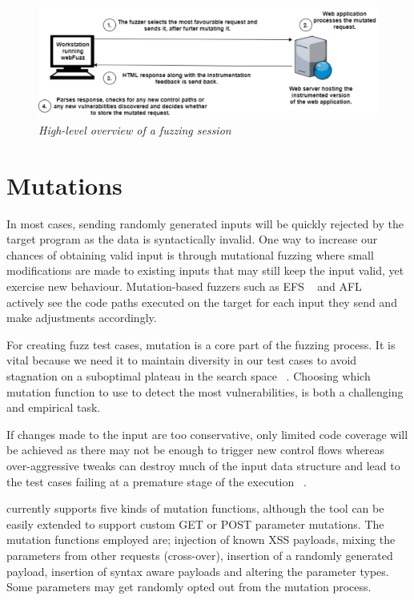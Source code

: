 \begin{figure}[ht]
 \centering
 \captionsetup{justification=centering}
 \includegraphics[width=\linewidth]{figures/architecture.pdf}
 \caption[High-level overview of a \pname{} fuzzing session]{\textit{High-level overview of a \pname{} fuzzing session}}
 \label{fig:architecture}
\end{figure}

\section{Mutations}
In most cases, sending randomly generated inputs will be quickly rejected by the target program as the data is syntactically invalid. One way to increase our chances of obtaining valid input is through mutational fuzzing where small modifications are made to existing inputs that may still keep the input valid, yet exercise new behaviour. Mutation-based fuzzers such as EFS ~\cite{efs2007} and AFL ~\cite{zalewski2015american} actively see the code paths executed on the target for each input they send and make adjustments accordingly. 

For creating fuzz test cases, mutation is a core part of the fuzzing process. It is vital because we need it to maintain diversity in our test cases to avoid stagnation on a suboptimal plateau in the search space ~\cite{seal2016Genetic}. Choosing which mutation function to use to detect the most vulnerabilities, is both a challenging and empirical task. 

If changes made to the input are too conservative, only limited code coverage will be achieved as there may not be enough to trigger new control flows whereas over-aggressive tweaks can destroy much of the input data structure and lead to the test cases failing at a premature stage of the execution ~\cite{zalewski2014Mutations}.

\pname{} currently supports five kinds of mutation functions, although the tool can be easily
extended to support custom GET or POST parameter mutations. The mutation functions employed are; injection of known XSS payloads, mixing the parameters from other requests (cross-over), insertion of a randomly generated payload, insertion of syntax aware payloads and altering the
parameter types. Some parameters may get randomly opted out from the mutation process. 

